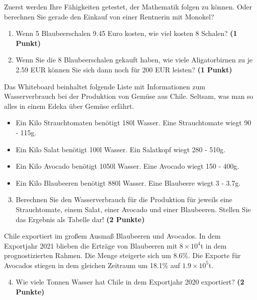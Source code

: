 \documentclass[a4paper, 9pt]{scrartcl}\usepackage[]{graphicx}\usepackage[]{xcolor}
\begin{document}
Zuerst werden Ihre Fähigkeiten getestet, der Mathematik folgen zu können. Oder berechnen Sie gerade den Einkauf von einer Rentnerin mit Monokel?\\

\begin{enumerate}
\item Wenn 5 Blaubeerschalen 9.45 Euro kosten,  wie viel kosten 8 Schalen? \textbf{(1 Punkt)}
\item Wenn Sie die 8 Blaubeerschalen gekauft haben, wie viele Aligatorbirnen zu je 2.59 EUR können Sie sich dann noch für 200 EUR leisten? \textbf{(1 Punkt)}
\end{enumerate}

Das Whiteboard beinhaltet folgende Liste mit Informationen zum Wasserverbrauch bei der Produktion von Gemüse aus Chile. Seltsam, was man so alles in einem Edeka über Gemüse erfährt.
  
\begin{itemize}[noitemsep]
\item Ein Kilo Strauchtomaten benötigt 180l Wasser. Eine Strauchtomate wiegt 90 - 115g.
\item Ein Kilo Salat benötigt 100l Wasser. Ein Salatkopf wiegt 280 - 510g.
\item Ein Kilo Avocado benötigt 1050l Wasser. Eine Avocado wiegt 150 - 400g.
\item Ein Kilo Blaubeeren benötigt 880l Wasser. Eine Blaubeere wiegt 3 - 3.7g.
\end{itemize}

\begin{enumerate}
  \setcounter{enumi}{2}
\item Berechnen Sie den Wasserverbrauch für die Produktion für jeweils eine Strauchtomate, einem Salat, einer Avocado und einer Blaubeeren. Stellen Sie das Ergebnis als Tabelle dar! \textbf{(2 Punkte)}
\end{enumerate}

Chile exportiert im großem Ausmaß Blaubeeren und Avocados. In dem Exportjahr 2021 blieben die Erträge von Blaubeeren mit \ensuremath{8\times 10^{4}}t in dem prognostizierten Rahmen. Die Menge steigerte sich um 8.6\%. Die Exporte für Avocados stiegen in dem gleichen Zeitraum um 18.1\% auf \ensuremath{1.9\times 10^{5}}t.

\begin{enumerate}
  \setcounter{enumi}{3}
\item Wie viele Tonnen Wasser hat Chile in dem Exportjahr 2020 exportiert? \textbf{(2 Punkte)}
\end{enumerate}
\end{document}
